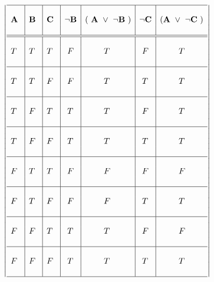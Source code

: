 \documentclass[10pt]{article}
\begin{document}
\[ 
\left | 
\begin{array}{l|l|l|l|l|l|l}
 \hline  & & & & & &  \\
  \bf  A \ & \bf  B \ & \bf  C \ & \bf \neg B & \bf ( \ A \ \vee \ \neg B \ ) & \bf \neg C & \bf ( A \ 
\vee \ \neg C \ ) \\
  & & & & & &   \\  
  \hline \hline & & & & & & \\
  T & T & T & \ F & \hspace{8mm} T & \ F & \hspace{8mm} T\\ 
  & & & & & & \\
  \hline & & & & & & \\
  T & T & F & \ F & \hspace{8mm} T & \ T & \hspace{8mm} T\\ 
  & & & & & & \\
  \hline & & & & & & \\
  T & F & T & \ T & \hspace{8mm} T & \ F & \hspace{8mm} T\\ 
  & & & & & & \\
  \hline & & & & & & \\
  T & F & F & \ T & \hspace{8mm} T & \ T & \hspace{8mm} T\\ 
  & & & & & & \\
  \hline & & & & & & \\
  F & T & T & \ F & \hspace{8mm} F & \ F & \hspace{8mm} F\\ 
  & & & & & & \\
  \hline & & & & & & \\
  F & T & F & \ F & \hspace{8mm} F & \ T & \hspace{8mm} T\\ 
  & & & & & & \\
  \hline & & & & & & \\
  F & F & T &  \ T & \hspace{8mm} T & \ F & \hspace{8mm} F\\ 
  & & & & & & \\
  \hline & & & & & & \\
  F & F & F & \ T & \hspace{8mm} T & \ T & \hspace{8mm} T\\ 
  & & & & & & \\
  \hline 
     \end{array} 
\right | \] 
\end{document}
